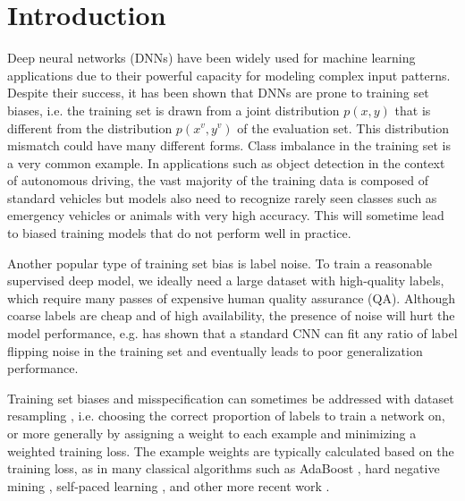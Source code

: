 
\section{Introduction}

Deep neural networks (DNNs) have been widely used for machine learning applications due to their
powerful capacity for modeling complex input patterns. Despite their  success, it has been shown
that DNNs are prone to training set biases, i.e. the training set  is drawn from a joint
distribution $p(x, y)$ that is different from the distribution $p(x^v, y^v)$ of the evaluation set.
This distribution mismatch could have many different forms.  Class imbalance in the training set is
a very common example. In applications such as object detection in the context of autonomous
driving, the vast majority of the training data is composed of standard  vehicles but models also
need to recognize rarely seen classes such as emergency vehicles or animals with very high accuracy.
This will sometime lead to biased training models that do not perform well in practice.

Another popular type of training set bias is label noise. To train a reasonable supervised deep
model, we ideally need a large dataset with high-quality labels, which require many passes of
expensive human quality assurance (QA). Although coarse labels are cheap and of high availability,
the presence of noise will hurt the model performance, e.g. \citet{rethink} has shown that a standard
CNN can fit any ratio of label flipping noise in the training set and eventually leads to poor
generalization performance.

Training set biases and misspecification can sometimes be addressed with dataset resampling
\cite{smote}, i.e. choosing the correct proportion of labels to train a network on, or more
generally by assigning a weight to each example and minimizing a weighted training loss. The example
weights are typically calculated based on the training loss, as in many classical algorithms such as
AdaBoost \cite{adaboost}, hard negative mining \cite{hardneg}, self-paced learning
\cite{kumar10selfpaced}, and other more recent work \cite{chang17activebias,jiang17mentornet}.

